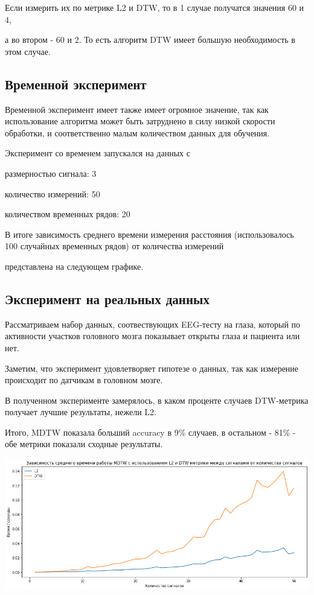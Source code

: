 \documentclass[12pt, twoside]{article}
\begin{document}
Если измерить их по метрике L2 и DTW, то в 1 случае получатся значения 60 и 4,

а во втором - 60 и 2. То есть алгоритм DTW имеет большую необходимость в этом случае.


\subsection{Временной эксперимент}

Временной эксперимент имеет также имеет огромное значение, так как использование алгоритма
может быть затруднено в силу низкой скорости обработки, и соответственно малым количеством данных для обучения.

Эксперимент со временем запускался на данных с 

размерностью сигнала: 3

количество измерений: 50

количеством временных рядов: 20

В итоге зависимость среднего времени измерения расстояния (использовалось 100 случайных временных рядов) от количества измерений

представлена на следующем графике.

\subsection{Эксперимент на реальных данных}

Рассматриваем набор данных, соотвествующих EEG-тесту на глаза, который по активности участков головного мозга показывает открыты глаза и пациента или нет.

Заметим, что эксперимент удовлетворяет гипотезе о данных, так как измерение происходит по датчикам в головном мозге.

В полученном эксперименте замерялось, в каком проценте случаев DTW-метрика получает лучшие результаты, нежели L2.

Итого, MDTW показала больший accuracy в 9\% случаев, в остальном - 81\% -  обе метрики показали сходные результаты.

\includegraphics[scale=0.5]{time}
\end{document}

